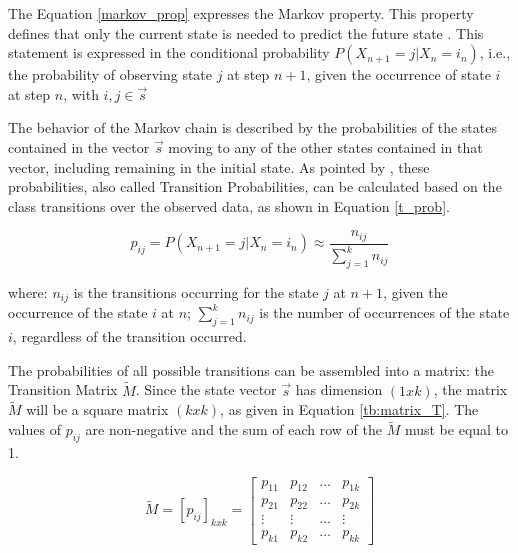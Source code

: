         The Equation \ref{markov_prop} expresses the Markov property. This property defines that only the current state is needed to predict the future state \citep{Blitzstein2014,Estacio2022, Mishra2007}. This statement is expressed in the conditional probability \(P(X_{n+1} = j|X_{n}=i_{n})\), i.e., the probability of observing state $j$ at step $n+1$, given the occurrence of state $i$ at step $n$, with $i,j \in \vec{s}$
    
        The behavior of the Markov chain is described by the probabilities of the states contained in the vector $\vec{s}$ moving to any of the other states contained in that vector, including remaining in the initial state. As pointed by \citet{Mishra2007}, these probabilities, also called Transition Probabilities, can be calculated based on the class transitions over the observed data, as shown in Equation \ref{t_prob}.
    
        \begin{equation}
            p_{ij}=P(X_{n+1}=j|X_{n}=i_{n})\approx\frac{n_{ij}}{\sum_{j=1}^{k}n_{ij}}
            \label{t_prob}
        \end{equation}
    
        where: $n_{ij}$ is the transitions occurring for the state $j$ at $n+1$, given the occurrence of the state $i$ at $n$; $\sum_{j=1}^{k}n_{ij}$ is the number of occurrences of the state $i$, regardless of the transition occurred.
    
        The probabilities of all possible transitions can be assembled into a matrix: the Transition Matrix $\tilde{M}$. Since the state vector $\vec{s}$ has dimension $(1xk)$, the matrix $\tilde{M}$ will be a square matrix $(kxk)$, as given in Equation \ref{tb:matrix_T}. The values of $p_{ij}$ are non-negative and the sum of each row of the $\tilde{M}$ must be equal to 1.
    
        \begin{equation}
            \tilde{M} = [p_{ij}]_{kxk} = \begin{bmatrix}
                p_{11} & p_{12} & \dots & p_{1k}\\
                p_{21} & p_{22} & \dots & p_{2k}\\
                \vdots & \vdots & \dots & \vdots\\
                p_{k1} & p_{k2} & \dots & p_{kk}
            \end{bmatrix}
            \label{tb:matrix_T}
        \end{equation}
        
